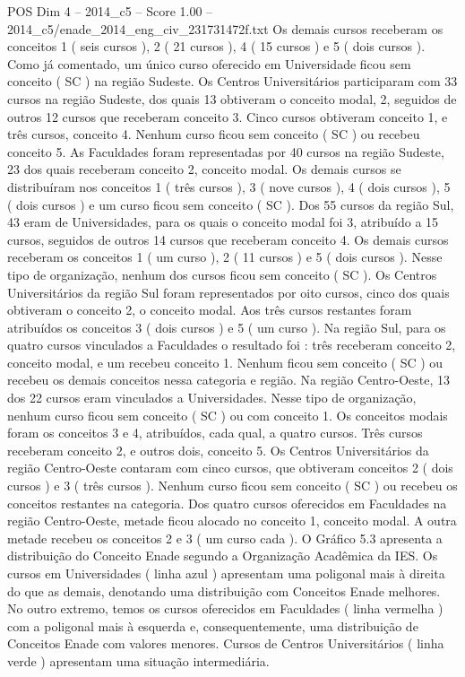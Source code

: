 \begin{textsample}{POS Dim 4 – 2014\_c5 – Score 1.00 – 2014\_c5/enade\_2014\_eng\_civ\_231731472f.txt}
Os demais cursos receberam os conceitos 1 ( seis cursos ), 2 ( 21 cursos ), 4 ( 15 cursos ) e 5 ( dois cursos ).
Como já comentado, um único curso oferecido em Universidade ficou sem conceito ( SC ) na região Sudeste.
Os Centros Universitários participaram com 33 cursos na região Sudeste, dos quais 13 obtiveram o conceito modal, 2, seguidos de outros 12 cursos que receberam conceito 3.
Cinco cursos obtiveram conceito 1, e três cursos, conceito 4.
Nenhum curso ficou sem conceito ( SC ) ou recebeu conceito 5.
As Faculdades foram representadas por 40 cursos na região Sudeste, 23 dos quais receberam conceito 2, conceito modal.
Os demais cursos se distribuíram nos conceitos 1 ( três cursos ), 3 ( nove cursos ), 4 ( dois cursos ), 5 ( dois cursos ) e um curso ficou sem conceito ( SC ).
Dos 55 cursos da região Sul, 43 eram de Universidades, para os quais o conceito modal foi 3, atribuído a 15 cursos, seguidos de outros 14 cursos que receberam conceito 4.
Os demais cursos receberam os conceitos 1 ( um curso ), 2 ( 11 cursos ) e 5 ( dois cursos ).
Nesse tipo de organização, nenhum dos cursos ficou sem conceito ( SC ).
Os Centros Universitários da região Sul foram representados por oito cursos, cinco dos quais obtiveram o conceito 2, o conceito modal.
Aos três cursos restantes foram atribuídos os conceitos 3 ( dois cursos ) e 5 ( um curso ).
Na região Sul, para os quatro cursos vinculados a Faculdades o resultado foi : três receberam conceito 2, conceito modal, e um recebeu conceito 1.
Nenhum ficou sem conceito ( SC ) ou recebeu os demais conceitos nessa categoria e região.
Na região Centro-Oeste, 13 dos 22 cursos eram vinculados a Universidades.
Nesse tipo de organização, nenhum curso ficou sem conceito ( SC ) ou com conceito 1.
Os conceitos modais foram os conceitos 3 e 4, atribuídos, cada qual, a quatro cursos.
Três cursos receberam conceito 2, e outros dois, conceito 5.
Os Centros Universitários da região Centro-Oeste contaram com cinco cursos, que obtiveram conceitos 2 ( dois cursos ) e 3 ( três cursos ).
Nenhum curso ficou sem conceito ( SC ) ou recebeu os conceitos restantes na categoria.
Dos quatro cursos oferecidos em Faculdades na região Centro-Oeste, metade ficou alocado no conceito 1, conceito modal.
A outra metade recebeu os conceitos 2 e 3 ( um curso cada ).
O Gráfico 5.3 apresenta a distribuição do Conceito Enade segundo a Organização Acadêmica da IES.
Os cursos em Universidades ( linha azul ) apresentam uma poligonal mais à direita do que as demais, denotando uma distribuição com Conceitos Enade melhores.
No outro extremo, temos os cursos oferecidos em Faculdades ( linha vermelha ) com a poligonal mais à esquerda e, consequentemente, uma distribuição de Conceitos Enade com valores menores.
Cursos de Centros Universitários ( linha verde ) apresentam uma situação intermediária.

\end{textsample}
